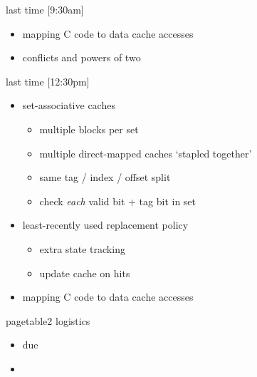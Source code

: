 \date{}
\title{}
\date{}

\begin{frame}
    \titlepage
\end{frame}




\begin{frame}{last time [9:30am]}
    \begin{itemize}
    \item mapping C code to data cache accesses
    \item conflicts and powers of two
    \end{itemize}
\end{frame}

\begin{frame}{last time [12:30pm]}
    \begin{itemize}
    \item set-associative caches
        \begin{itemize}
        \item multiple blocks per set
        \item multiple direct-mapped caches `stapled together'
        \item same tag / index / offset split
        \item check \textit{each} valid bit + tag bit in set
        \end{itemize}
    \item least-recently used replacement policy
        \begin{itemize}
        \item extra state tracking
        \item update cache on hits
        \end{itemize}
    \item mapping C code to data cache accesses
    \end{itemize}
\end{frame}

\begin{frame}{pagetable2 logistics}
    \begin{itemize}
    \item due 
    \item {}
    \end{itemize}
\end{frame}


